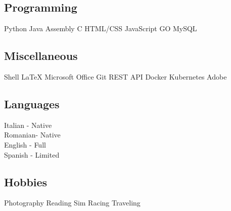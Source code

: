 \documentclass[a4paper]{MagicalCV}
\begin{document}
\begin{minipage}[t]{0.32\textwidth}

\subsection{Programming}
Python \textbullet{}   Java\textbullet{} Assembly \textbullet{} C \textbullet{} HTML/CSS  \textbullet{}
JavaScript \textbullet{} GO \textbullet MySQL  \textbullet{}
\sectionsep
\subsection{Miscellaneous}
Shell \textbullet{} \LaTeX \textbullet{} Microsoft Office  \textbullet{} Git  \textbullet{} REST API  \textbullet{} Docker  \textbullet{} Kubernetes \textbullet Adobe
\sectionsep


\subsection{Languages}
Italian - Native \\
Romanian- Native \\
English - Full \\
Spanish - Limited
 \sectionsep
 
\subsection{Hobbies}
Photography \textbullet{} Reading \textbullet{} Sim Racing \textbullet{}
 Traveling 
 \sectionsep

\end{minipage} 
\hfill
\end{document}
